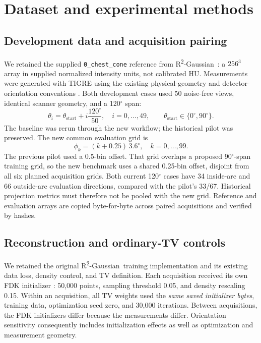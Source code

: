 \documentclass[10pt,a4paper]{article}
\newcommand{\Rtwo}{R\textsuperscript{2}-Gaussian}
\begin{document}
\section{Dataset and experimental methods}
\subsection{Development data and acquisition pairing}
We retained the supplied \texttt{0\_chest\_cone} reference from \Rtwo\ \cite{r2,upstream}: a $256^3$ array in supplied normalized intensity units, not calibrated HU. Measurements were generated with TIGRE using the existing physical-geometry and detector-orientation conventions \cite{tigre}. Both development cases used 50 noise-free views, identical scanner geometry, and a 120$^\circ$ span:
\begin{equation}
\theta_i=\theta_{\mathrm{start}}+i\frac{120^\circ}{50},\quad i=0,\ldots,49,\qquad
\theta_{\mathrm{start}}\in\{0^\circ,90^\circ\}.
\end{equation}
The baseline was rerun through the new workflow; the historical pilot was preserved. The new common evaluation grid is
\begin{equation}
\phi_k=(k+0.25)\,3.6^\circ,\quad k=0,\ldots,99.
\end{equation}
The previous pilot used a 0.5-bin offset. That grid overlaps a proposed 90$^\circ$-span training grid, so the new benchmark uses a shared 0.25-bin offset, disjoint from all six planned acquisition grids. Both current 120$^\circ$ cases have 34 inside-arc and 66 outside-arc evaluation directions, compared with the pilot's 33/67. Historical projection metrics must therefore not be pooled with the new grid. Reference and evaluation arrays are copied byte-for-byte across paired acquisitions and verified by hashes.

\subsection{Reconstruction and ordinary-TV controls}
We retained the original \Rtwo\ training implementation and its existing data loss, density control, and TV definition. Each acquisition received its own FDK initializer \cite{fdk}: 50,000 points, sampling threshold 0.05, and density rescaling 0.15. Within an acquisition, all TV weights used the \emph{same saved initializer bytes}, training data, optimization seed zero, and 30,000 iterations. Between acquisitions, the FDK initializers differ because the measurements differ. Orientation sensitivity consequently includes initialization effects as well as optimization and measurement geometry.
\end{document}
